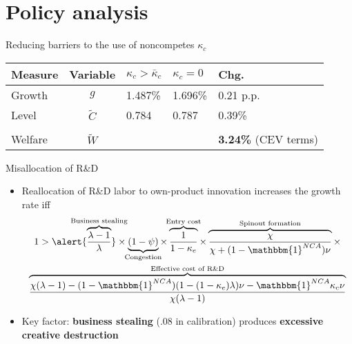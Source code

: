 \documentclass[english,usenames,dvipsnames]{beamer}
\begin{document}
\section{Policy analysis}

\begin{frame}
\tableofcontents[currentsection]
\end{frame}

\begin{frame}{Reducing barriers to the use of noncompetes $\kappa_c$}\label{reducing_kappa_c_table}
	\begin{table}
		\centering
		\small
		\begin{tabular}{lclll}
			\toprule \toprule
			Measure & Variable & $\kappa_c > \bar{\kappa}_c$ & $\kappa_c = 0$ & Chg. \tabularnewline
			\midrule
			Growth & $g$ & 1.487\% & 1.696\% & 0.21 p.p. \tabularnewline
			Level & $\tilde{C}$  & 0.784 &  0.787 & 0.39\% \tabularnewline 
			\tabularnewline
			Welfare & $\tilde{W}$  &  & & \alert{\textbf{3.24\%}} (CEV terms)  \tabularnewline
			\bottomrule
		\end{tabular}
	\end{table}
	\hyperlink{welfare}{}
	\hyperlink{decomposition_growth_increase}{}
	\hyperlink{plots:reducing_kappa_c1}{}
	\hyperlink{plots:reducing_kappa_c2}{}
	\hyperlink{robustness_to_moments}{} \hyperlink{robustness_to_parameters}{}
	\hyperlink{efficiency}{}
\end{frame}


\begin{frame}{Misallocation of R\&D}\label{misallocation_of_rd}
	\begin{itemize}
		\item <+-> Reallocation of R\&D labor to own-product innovation increases the growth rate iff \hyperlink{misallocation_of_rd:derivation}{}
		\footnotesize
		\begin{multline*}
		1 > \alert{\overbrace{\frac{\lambda-1}{\lambda}}^{\mathclap{\text{Business stealing}}}} \times \underbrace{(1-\psi)}_{\mathclap{\text{Congestion}}}   \times \overbrace{\frac{1}{1-\kappa_{e}}}^{\mathclap{\text{Entry cost}}} \times \overbrace{\frac{\chi}{\chi + (1-\mathbbm{1}^{NCA})\nu}}^{\mathclap{\text{Spinout formation}}} \times \\ \overbrace{\frac{\chi(\lambda-1) -(1-\mathbbm{1}^{NCA}) (1-(1-\kappa_e)\lambda)\nu - \mathbbm{1}^{NCA} \kappa_c \nu}{\chi(\lambda-1)}}^{\mathclap{\text{Effective cost of R\&D}}}  \label{eq:RD_reallocation} 
		\end{multline*}
		\normalsize
		\item <+-> Key factor: \alert{\textbf{business stealing}} (.08 in calibration) produces \alert{\textbf{excessive creative destruction}} \hyperlink{other_factors}{}
	\end{itemize}
\end{frame}
\end{document}
